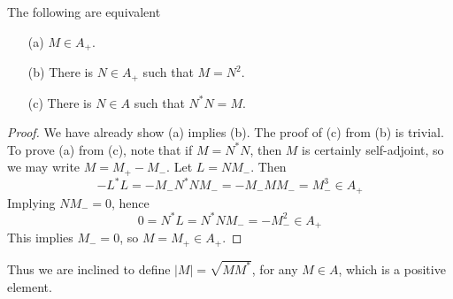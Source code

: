 \begin{prop}
    The following are equivalent
    \begin{enumerate}
        \item[(a)] $M \in A_+$.
        \item[(b)] There is $N \in A_+$ such that $M = N^2$.
        \item[(c)] There is $N \in A$ such that $N^*N = M$.
    \end{enumerate}
\end{prop}
\begin{proof}
    We have already show (a) implies (b). The proof of (c) from (b) is trivial. To prove (a) from (c), note that if $M = N^*N$, then $M$ is certainly self-adjoint, so we may write $M = M_+ - M_-$. Let $L = NM_-$. Then
    \[ - L^*L = - M_-N^*NM_- = - M_- M M_- = M_-^3 \in A_+ \]
    Implying $NM_- = 0$, hence
    \[ 0 = N^*L = N^*NM_- = -M_-^2 \in A_+ \]
    This implies $M_- = 0$, so $M = M_+ \in A_+$.
\end{proof}

Thus we are inclined to define $|M| = \sqrt{MM^*}$, for any $M \in A$, which is a positive element.

